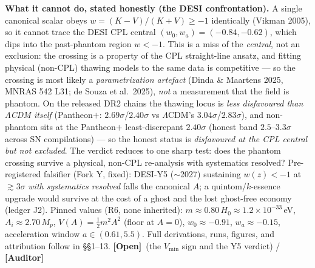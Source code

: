 \documentclass[11pt]{article}
\newcommand{\Open}{\textbf{\textcolor{gray!10!black}{[Open]}}}
\newcommand{\Auditor}{\textbf{\textcolor{teal!55!black}{[Auditor]}}}
\begin{document}
\noindent\textbf{What it cannot do, stated honestly (the DESI confrontation).} A single canonical scalar obeys $w=(K-V)/(K+V)\ge-1$ identically (Vikman 2005), so it cannot trace the DESI CPL central $(w_0,w_a)=(-0.84,-0.62)$, which dips into the past-phantom region $w<-1$. This is a miss of the \emph{central}, not an exclusion: the crossing is a property of the CPL straight-line ansatz, and fitting physical (non-CPL) thawing models to the same data is competitive --- so the crossing is most likely a \emph{parametrization artefact} (Dinda \& Maartens 2025, MNRAS 542 L31; de Souza et al.\ 2025), \emph{not} a measurement that the field is phantom. On the released DR2 chains the thawing locus is \emph{less disfavoured than $\Lambda$CDM itself} (Pantheon$+$: $2.69\sigma$/$2.40\sigma$ vs $\Lambda$CDM's $3.04\sigma$/$2.83\sigma$), and non-phantom sits at the Pantheon$+$ least-discrepant $2.40\sigma$ (honest band $2.5$--$3.3\sigma$ across SN compilations) --- so the honest status is \emph{disfavoured at the CPL central but not excluded}. The verdict reduces to one sharp test: does the phantom crossing survive a physical, non-CPL re-analysis with systematics resolved? Pre-registered falsifier (Fork Y, fixed): DESI-Y5 ($\sim$2027) sustaining $w(z)<-1$ at $\gtrsim3\sigma$ \emph{with systematics resolved} falls the canonical $A$; a quintom/$k$-essence upgrade would survive at the cost of a ghost and the lost ghost-free economy (ledger J2). Pinned values (R6, none inherited): $m\approx0.80\,H_0\approx1.2\times10^{-33}$\,eV, $A_i\approx2.70\,M_p$, $V(A)=\tfrac12 m^2A^2$ (floor at $A=0$), $w_0\approx-0.91$, $w_a\approx-0.15$, acceleration window $a\in(0.61,5.5)$. Full derivations, runs, figures, and attribution follow in \S\S1--13. \Open\ (the $V_{\min}$ sign and the Y5 verdict) / \Auditor

\end{document}
